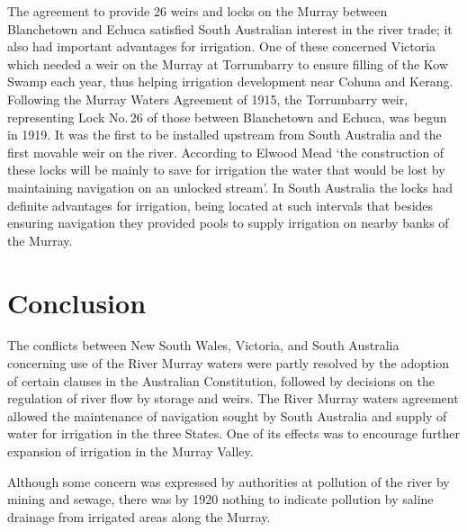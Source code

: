 The agreement to provide 26 weirs and locks on the Murray between
Blanche\-town and Echuca satisfied South Australian interest in the
river trade; it also had important advantages for irrigation.  One of these
concerned Victoria which needed a weir on the Murray at Torrumbarry to
ensure filling of the Kow Swamp each year, thus helping irrigation
development near Cohuna and Kerang. Following the Murray Waters Agreement of 1915, the
Torrumbarry weir, representing Lock No.\,26 of those between
Blanchetown and Echuca, was begun in 1919. It was the first to be installed upstream from South
Australia and the first movable weir on the river.  According to
Elwood Mead `the construction of these locks will be mainly to save
for irrigation the water that would be lost by maintaining navigation
on an unlocked stream'.  In South Australia the
locks had definite advantages for irrigation, being located at such
intervals that besides ensuring navigation they provided pools to
supply irrigation on nearby banks of the Murray.

\section*{Conclusion}

The conflicts between New South Wales, Victoria, and South Australia
concerning use of the River Murray waters were partly resolved by the
adoption of certain clauses in the Australian Constitution, followed
by decisions on the regulation of river flow by storage and weirs.
The River Murray waters agreement allowed the maintenance of
navigation sought by South Australia and supply of water for
irrigation in the three States.  One of its effects was to encourage
further expansion of irrigation in the Murray Valley.

Although some concern was expressed by authorities at pollution of the
river by mining and sewage, there was by 1920 nothing to indicate
pollution by saline drainage from irrigated areas along the Murray.

